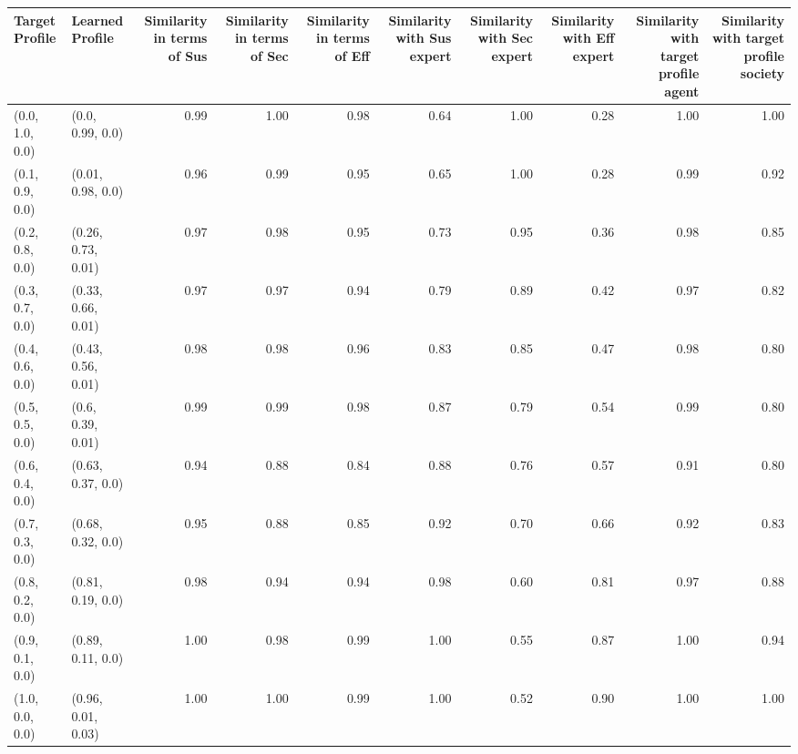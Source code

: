 \begin{tabular}{llrrrrrrrr}
\toprule
Target Profile & Learned Profile & Similarity in terms of Sus & Similarity in terms of Sec & Similarity in terms of Eff & Similarity with Sus expert & Similarity with Sec expert & Similarity with Eff expert & Similarity with target profile agent & Similarity with target profile society \\
\midrule
(0.0, 1.0, 0.0) & (0.0, 0.99, 0.0) & 0.99 & 1.00 & 0.98 & 0.64 & 1.00 & 0.28 & 1.00 & 1.00 \\
(0.1, 0.9, 0.0) & (0.01, 0.98, 0.0) & 0.96 & 0.99 & 0.95 & 0.65 & 1.00 & 0.28 & 0.99 & 0.92 \\
(0.2, 0.8, 0.0) & (0.26, 0.73, 0.01) & 0.97 & 0.98 & 0.95 & 0.73 & 0.95 & 0.36 & 0.98 & 0.85 \\
(0.3, 0.7, 0.0) & (0.33, 0.66, 0.01) & 0.97 & 0.97 & 0.94 & 0.79 & 0.89 & 0.42 & 0.97 & 0.82 \\
(0.4, 0.6, 0.0) & (0.43, 0.56, 0.01) & 0.98 & 0.98 & 0.96 & 0.83 & 0.85 & 0.47 & 0.98 & 0.80 \\
(0.5, 0.5, 0.0) & (0.6, 0.39, 0.01) & 0.99 & 0.99 & 0.98 & 0.87 & 0.79 & 0.54 & 0.99 & 0.80 \\
(0.6, 0.4, 0.0) & (0.63, 0.37, 0.0) & 0.94 & 0.88 & 0.84 & 0.88 & 0.76 & 0.57 & 0.91 & 0.80 \\
(0.7, 0.3, 0.0) & (0.68, 0.32, 0.0) & 0.95 & 0.88 & 0.85 & 0.92 & 0.70 & 0.66 & 0.92 & 0.83 \\
(0.8, 0.2, 0.0) & (0.81, 0.19, 0.0) & 0.98 & 0.94 & 0.94 & 0.98 & 0.60 & 0.81 & 0.97 & 0.88 \\
(0.9, 0.1, 0.0) & (0.89, 0.11, 0.0) & 1.00 & 0.98 & 0.99 & 1.00 & 0.55 & 0.87 & 1.00 & 0.94 \\
(1.0, 0.0, 0.0) & (0.96, 0.01, 0.03) & 1.00 & 1.00 & 0.99 & 1.00 & 0.52 & 0.90 & 1.00 & 1.00 \\
\bottomrule
\end{tabular}
